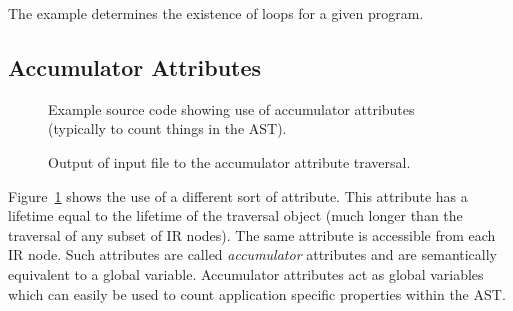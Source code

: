    The example determines the existence of loops for a given program.



\clearpage
\subsection{Accumulator Attributes}

\begin{figure}[!h]
{\indent
{\mySmallFontSize


\begin{latexonly}
   
\end{latexonly}

\begin{htmlonly}
   
\end{htmlonly}

}
}
\caption{Example source code showing use of accumulator attributes (typically to count
    things in the AST).}
\label{Tutorial:exampleAccumulatorAttributeTraversal}
\end{figure}


\begin{figure}[!h]
{\indent
{\mySmallFontSize


\begin{latexonly}
   
\end{latexonly}

\begin{htmlonly}
   
\end{htmlonly}

}
}
\caption{Output of input file to the accumulator attribute traversal.}
\label{Tutorial:exampleOutput_AccumulatorAttributeTraversal}
\end{figure}

   Figure~\ref{Tutorial:exampleAccumulatorAttributeTraversal} shows the use of
a different sort of attribute.  This attribute has a lifetime equal to the
lifetime of the traversal object (much longer than the traversal of any subset 
of IR nodes).  The same attribute is accessible from each IR node.  Such 
attributes are called {\em accumulator} attributes and are semantically 
equivalent to a global variable. Accumulator attributes
act as global variables which can easily be used to count application 
specific properties within the AST. 

